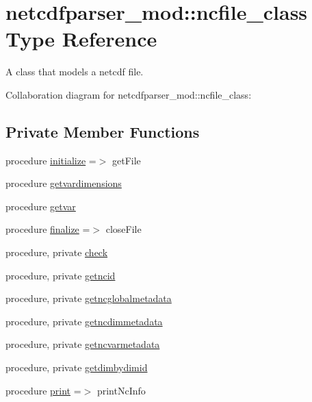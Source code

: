 \hypertarget{structnetcdfparser__mod_1_1ncfile__class}{}\section{netcdfparser\+\_\+mod\+:\+:ncfile\+\_\+class Type Reference}
\label{structnetcdfparser__mod_1_1ncfile__class}


A class that models a netcdf file.  




Collaboration diagram for netcdfparser\+\_\+mod\+:\+:ncfile\+\_\+class\+:
\subsection*{Private Member Functions}
\begin{DoxyCompactItemize}
\item 
procedure \mbox{\hyperlink{structnetcdfparser__mod_1_1ncfile__class_a5f736ec85f6aff6ea52407d3f47cd4a1}{initialize}} =$>$ get\+File
\item 
procedure \mbox{\hyperlink{structnetcdfparser__mod_1_1ncfile__class_a6d381b153b3aca351ddafc042834a96b}{getvardimensions}}
\item 
procedure \mbox{\hyperlink{structnetcdfparser__mod_1_1ncfile__class_a616823bed0c99a683741ce8398898b72}{getvar}}
\item 
procedure \mbox{\hyperlink{structnetcdfparser__mod_1_1ncfile__class_a62c3404b0742346374753743e349e6f1}{finalize}} =$>$ close\+File
\item 
procedure, private \mbox{\hyperlink{structnetcdfparser__mod_1_1ncfile__class_a2b41dc377688a881f9252bd4fc09bec9}{check}}
\item 
procedure, private \mbox{\hyperlink{structnetcdfparser__mod_1_1ncfile__class_a78eb48e6493c1f48f44b89517addf2bc}{getncid}}
\item 
procedure, private \mbox{\hyperlink{structnetcdfparser__mod_1_1ncfile__class_a8fc97bc9b7ed5f74d29436dfc527d6e2}{getncglobalmetadata}}
\item 
procedure, private \mbox{\hyperlink{structnetcdfparser__mod_1_1ncfile__class_aace24549667b19d98fd2220684e34b64}{getncdimmetadata}}
\item 
procedure, private \mbox{\hyperlink{structnetcdfparser__mod_1_1ncfile__class_a87e2ab9be12dd33782a39be6103c05b4}{getncvarmetadata}}
\item 
procedure, private \mbox{\hyperlink{structnetcdfparser__mod_1_1ncfile__class_a3d0ee52a9df4b11f8566592fa283202a}{getdimbydimid}}
\item 
procedure \mbox{\hyperlink{structnetcdfparser__mod_1_1ncfile__class_af7aae078c0672cbfe8e6667311a94dcd}{print}} =$>$ print\+Nc\+Info
\end{DoxyCompactItemize}
